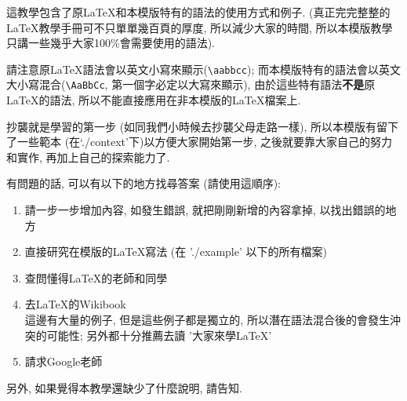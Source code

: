 

這教學包含了原LaTeX和本模版特有的語法的使用方式和例子. (真正完完整整的LaTeX教學手冊可不只單單幾百頁的厚度, 所以減少大家的時間, 所以本模版教學只講一些幾乎大家100\%會需要使用的語法).

請注意原LaTeX語法會以英文小寫來顯示(\verb|\aabbcc|); 而本模版特有的語法會以英文大小寫混合(\verb|\AaBbCc|, 第一個字必定以大寫來顯示), 由於這些特有語法\textbf{不是}原LaTeX的語法, 所以不能直接應用在非本模版的LaTeX檔案上.

抄襲就是學習的第一步 (如同我們小時候去抄襲父母走路一樣), 所以本模版有留下了一些範本 (在`./context'下)以方便大家開始第一步, 之後就要靠大家自己的努力和實作, 再加上自己的探索能力了.

有問題的話, 可以有以下的地方找尋答案 (請使用這順序):
\begin{enumerate}
  \item 請一步一步增加內容, 如發生錯誤, 就把剛剛新增的內容拿掉, 以找出錯誤的地方
  \item 直接研究在模版的LaTeX寫法 (在 './example' 以下的所有檔案)
  \item 查問懂得LaTeX的老師和同學
  \item 去LaTeX的Wikibook \\
        這邊有大量的例子, 但是這些例子都是獨立的, 所以潛在語法混合後的會發生沖突的可能性; 另外都十分推薦去讀 '大家來學LaTeX' 
  \item 請求Google老師
\end{enumerate}

另外, 如果覺得本教學還缺少了什麼說明, 請告知.


\newpage
\newpage
\newpage
\newpage
\newpage
\newpage
\newpage
\newpage

\EndChapter
